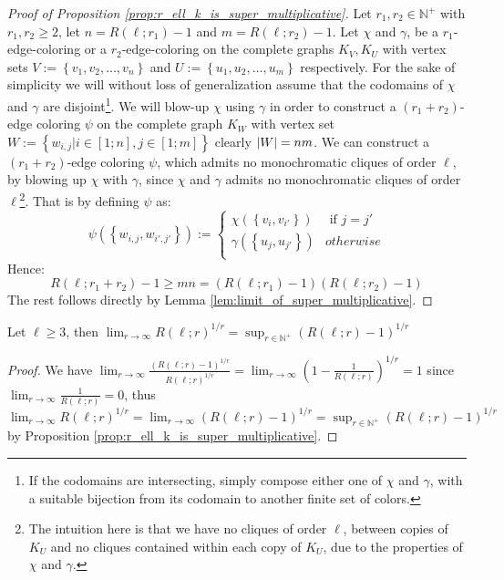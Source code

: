 \begin{proof}[Proof of Proposition \ref{prop:r_ell_k_is_super_multiplicative}]
	Let $r_{1}, r_2 \in \mathbb{N}^{+}$ with $r_1, r_2 \geq 2$, let $n = R(\ell; r_{1}) - 1$ and $m = R(\ell; r_{2}) - 1$. Let $\chi$ and $\gamma$, be a $r_{1}$-edge-coloring or a $r_2$-edge-coloring on the complete graphs $K_V, K_U$ with vertex sets $V := \left\{v_1, v_2, \ldots, v_{n}\right\}$ and $U := \left\{u_1, u_2, \ldots, u_{m}\right\}$ respectively.
	For the sake of simplicity we will without loss of generalization assume that the codomains of $\chi$ and $\gamma$ are disjoint\footnote{If the codomains are intersecting, simply compose either one of $\chi$ and $\gamma$, with a suitable bijection from its codomain to another finite set of colors.}. We will blow-up $\chi$ using $\gamma$ in order to construct a $(r_1 + r_2)$-edge coloring $\psi$ on the complete graph $K_{W}$ with vertex set $W := \left\{w_{i, j} | i \in [1; n], j \in [1; m]\right\}$ clearly $\left\lvert W\right\rvert = nm$. We can construct a $(r_1 + r_2)$-edge coloring $\psi$, which admits no monochromatic cliques of order $\ell$, by blowing up $\chi$ with $\gamma$, since $\chi$ and $\gamma$ admits no monochromatic cliques of order $\ell$\footnote{The intuition here is that we have no cliques of order $\ell$, between copies of $K_{U}$ and no cliques contained within each copy of $K_{U}$, due to the properties of $\chi$ and $\gamma$.}.
	That is by defining $\psi$ as:
	\begin{equation*}
		\psi(\left \{w_{i,j}, w_{i', j'}\right\}) := \begin{cases}
			\chi(\left\{v_{i}, v_{i'}\right\})   & \text{ if } j = j' \\
			\gamma(\left\{u_{j}, u_{j'}\right\}) & otherwise          \\
		\end{cases}
	\end{equation*}
	Hence:
	\begin{equation*}
		R(\ell; r_{1} + r_{2}) - 1 \geq mn = (R(\ell; r_{1}) - 1)(R(\ell; r_{2}) - 1)
	\end{equation*}
	The rest follows directly by Lemma \ref{lem:limit_of_super_multiplicative}.
\end{proof}

\begin{corollary}\label{cor:limit_of_R}
	Let $\ell \geq 3$, then $\lim_{r \to \infty} R(\ell; r)^{1/r} = \sup_{r \in \mathbb{N}^{+}} (R(\ell; r) - 1)^{1/r}$
\end{corollary}
\begin{proof}
	We have $\lim_{r \to \infty} \frac{\left(R(\ell; r) - 1\right)^{1/r}}{R(\ell;r)^{1/r}} = \lim_{r \to \infty} \left(1 -  \frac{1}{R(\ell;r)}\right)^{1 / r} = 1$ since $\lim_{r \to \infty} \frac{1}{R(\ell; r)} = 0$, thus $\lim_{r \to \infty} R(\ell; r) ^{1/r} = \lim_{r \to \infty} \left(R(\ell; r) - 1\right)^{1/r} = \sup_{r \in \mathbb{N}^{+}} (R(\ell; r) - 1)^{1/r}$ by Proposition \ref{prop:r_ell_k_is_super_multiplicative}.
\end{proof}

